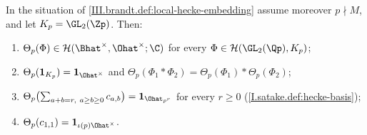 In the situation of \cref{III.brandt.def:local-hecke-embedding} assume moreover $p\nmid M$, and let $K_p=\GL_2(\Zp)$. Then:
\begin{enumerate}[label=(\alph*)]
\item $\Theta_p(\Phi)\in\mathcal H(\Bhat^\times,\Ohat^\times;\C)$ for every $\Phi\in\mathcal H(\GL_2(\Qp),K_p)$;
\item $\Theta_p(\mathbf 1_{K_p})=\mathbf 1_{\Ohat^\times}$ and $\Theta_p(\Phi_1*\Phi_2)=\Theta_p(\Phi_1)*\Theta_p(\Phi_2)$;
\item $\Theta_p\bigl(\sum_{a+b=r,\ a\ge b\ge0}c_{a,b}\bigr)=\mathbf 1_{\Ohat_{p^r}}$ for every $r\ge0$ (\cref{I.satake.def:hecke-basis});
\item $\Theta_p(c_{1,1})=\mathbf 1_{\iota(p)\Ohat^\times}$.
\end{enumerate}
